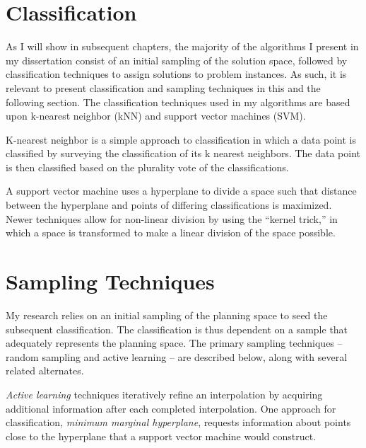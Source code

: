 \section{Classification}

As I will show in subsequent chapters, the majority of the algorithms I present in my dissertation consist of an initial sampling of the solution space, followed by classification techniques to assign solutions to problem instances.  As such, it is relevant to present classification and sampling techniques in this and the following section.  The classification techniques used in my algorithms are based upon k-nearest neighbor (kNN) and support vector machines (SVM).

K-nearest neighbor \citep{cover67nearestneighbor} is a simple approach to classification in which a data point is classified by surveying the classification of its k nearest neighbors.  The data point is then classified based on the plurality vote of the classifications.  %

A support vector machine \citep{vapnik95svm} uses a hyperplane to divide a space such that distance between the hyperplane and points of differing classifications is maximized.  Newer techniques allow for non-linear division by using the ``kernel trick,'' in which a space is transformed to make a linear division of the space possible.




\section{Sampling Techniques}

My research relies on an initial sampling of the planning space to seed the subsequent classification.  The classification is thus dependent on a sample that adequately represents the planning space.  The primary sampling techniques -- random sampling and active learning -- are described below, along with several related alternates.



\textit{Active learning} \citep{Settles10activelearning} techniques iteratively refine an interpolation by acquiring additional information after each completed interpolation.  One approach for classification, \textit{minimum marginal hyperplane}, requests information about points close to the hyperplane that a support vector machine would construct.

